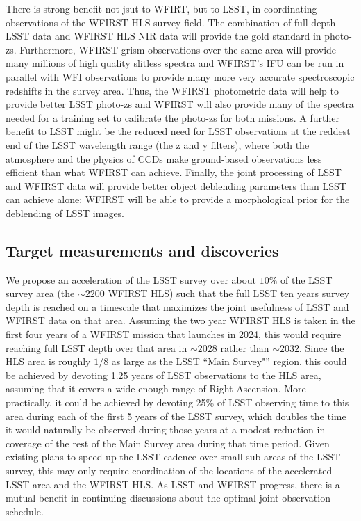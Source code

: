 There is strong benefit not jsut to WFIRT, but to LSST, in coordinating
observations of the WFIRST HLS survey field. The combination of
full-depth LSST data and WFIRST HLS NIR data will provide the gold
standard in photo-zs.  Furthermore, WFIRST grism observations over the
same area will provide many millions of high quality slitless spectra
and WFIRST’s IFU can be run in parallel with WFI observations to provide
many more very accurate spectroscopic redshifts in the survey area.
Thus, the WFIRST photometric data will help to provide better LSST
photo-zs and  WFIRST will also provide many of the spectra needed for a
training set to calibrate the photo-zs for both missions.  A further
benefit to LSST might be the reduced need for LSST observations at the
reddest end of the LSST wavelength range (the z and y filters), where
both the atmosphere and the physics of CCDs make ground-based
observations less efficient than what WFIRST can achieve. Finally, the
joint processing of LSST and WFIRST data will provide better object
deblending parameters than LSST can achieve alone; WFIRST will be able
to provide a morphological prior for the deblending of LSST images.


\subsection{Target measurements and discoveries}
\label{sec:\secname:targets}

We propose an acceleration of the LSST survey over about $10\%$ of the
LSST survey area (the $\sim2200$ WFIRST HLS) such that the full LSST ten
years survey depth is reached on a timescale that maximizes the joint
usefulness of LSST and WFIRST data on that area.  Assuming the two year
WFIRST HLS is taken in the first four years of a WFIRST mission that
launches in 2024, this would require reaching full LSST depth over that
area in $\sim2028$ rather than $\sim2032$. Since the HLS area is roughly
$1/8$ as large as the LSST ``Main Survey"'' region, this could be
achieved by devoting 1.25 years of LSST observations to the HLS area,
assuming that it covers a wide enough range of Right Ascension.  More
practically, it could be achieved by devoting 25\% of LSST observing
time to this area during each of the first 5 years of the LSST survey,
which doubles the time it would naturally be observed during those years
at a modest reduction in coverage of the rest of the Main Survey area
during that time period.   Given existing plans to speed up the LSST
cadence over small sub-areas of the LSST survey, this may only require
coordination of the locations of the accelerated LSST area and the
WFIRST HLS. As LSST and WFIRST progress, there is a mutual benefit in
continuing discussions about the optimal joint observation schedule.

